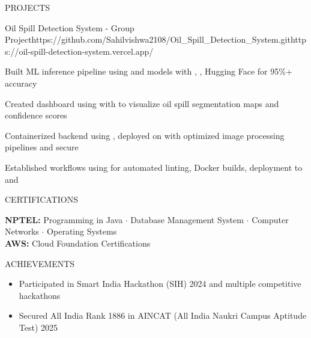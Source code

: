 \documentclass{resume}
\begin{document}
\begin{rSection}{PROJECTS}
\begin{rProject}{Oil Spill Detection System - Group Project}{https://github.com/Sahilvishwa2108/Oil_Spill_Detection_System.git}{https://oil-spill-detection-system.vercel.app/}
\item Built ML inference pipeline using  and  models with , , Hugging Face for 95\%+ accuracy
\item Created dashboard using  with  to visualize oil spill segmentation maps and confidence scores
\item Containerized backend using , deployed on  with optimized image processing pipelines and secure 
\item Established  workflows using  for automated linting, Docker builds, deployment to  and 
\end{rProject}

\end{rSection}

\begin{rSection}{CERTIFICATIONS}

\textbf{NPTEL:} Programming in Java $\cdot$ Database Management System $\cdot$ Computer Networks $\cdot$ Operating Systems \\[1pt]
\textbf{AWS:} Cloud Foundation Certifications

\end{rSection}

\begin{rSection}{ACHIEVEMENTS}

\begin{itemize}[leftmargin=12pt, itemsep=0pt, label={\small$\bullet$}]
\item Participated in Smart India Hackathon (SIH) 2024 and multiple competitive hackathons
\item Secured All India Rank 1886 in AINCAT (All India Naukri Campus Aptitude Test) 2025
\end{itemize}

\end{rSection}
\end{document}

